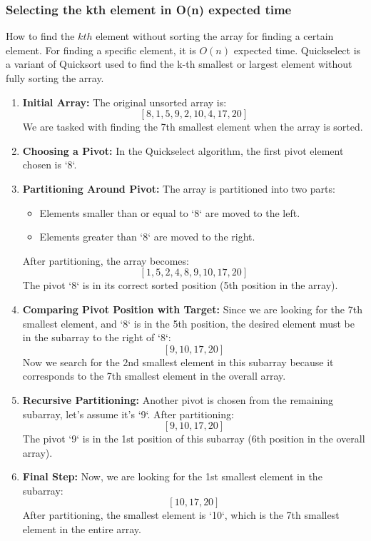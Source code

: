     \subsubsection{Selecting the kth element in O(n) expected time}
    \begin{example}
        How to find the $kth$ element without sorting the array for finding a certain element. For finding a specific element, it is $O(n)$ expected time. Quickselect is a variant of Quicksort used to find the
        k-th smallest or largest element without fully sorting the array.            
        \begin{enumerate}
            \item \textbf{Initial Array:} The original unsorted array is:
            \[
            [8, 1, 5, 9, 2, 10, 4, 17, 20]
            \]
            We are tasked with finding the 7th smallest element when the array is sorted.
            
            \item \textbf{Choosing a Pivot:} In the Quickselect algorithm, the first pivot element chosen is `8`.
            
            \item \textbf{Partitioning Around Pivot:} The array is partitioned into two parts:
            \begin{itemize}
                \item Elements smaller than or equal to `8` are moved to the left.
                \item Elements greater than `8` are moved to the right.
            \end{itemize}
            After partitioning, the array becomes:
            \[
            [1, 5, 2, 4, 8, 9, 10, 17, 20]
            \]
            The pivot `8` is in its correct sorted position (5th position in the array).
            
            \item \textbf{Comparing Pivot Position with Target:} Since we are looking for the 7th smallest element, and `8` is in the 5th position, the desired element must be in the subarray to the right of `8`:
            \[
            [9, 10, 17, 20]
            \]
            Now we search for the 2nd smallest element in this subarray because it corresponds to the 7th smallest element in the overall array.
            
            \item \textbf{Recursive Partitioning:} Another pivot is chosen from the remaining subarray, let’s assume it’s `9`. After partitioning:
            \[
            [9, 10, 17, 20]
            \]
            The pivot `9` is in the 1st position of this subarray (6th position in the overall array).
            
            \item \textbf{Final Step:} Now, we are looking for the 1st smallest element in the subarray:
            \[
            [10, 17, 20]
            \]
            After partitioning, the smallest element is `10`, which is the 7th smallest element in the entire array.
        \end{enumerate}        
    \end{example}

